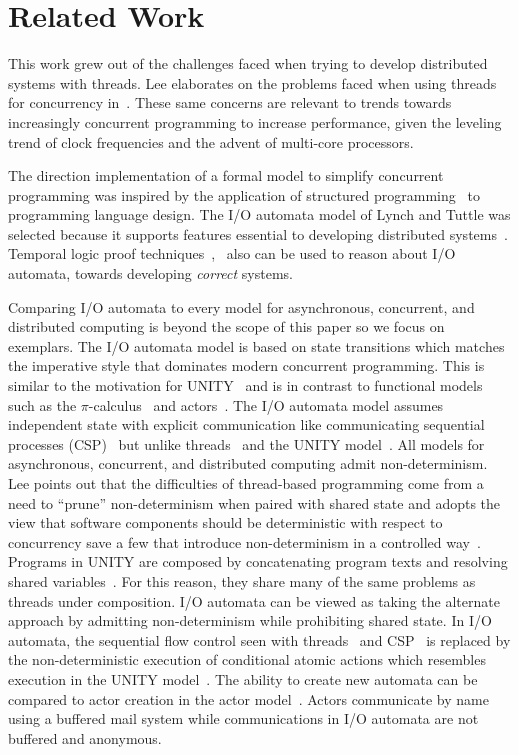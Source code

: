 \section{Related Work\label{related_work}}

This work grew out of the challenges faced when trying to develop distributed systems with threads.
Lee elaborates on the problems faced when using threads for concurrency in~\cite{lee2006problem}.
These same concerns are relevant to trends towards increasingly concurrent programming to increase performance, given the leveling trend of clock frequencies and the advent of multi-core processors\cite{sutter2005software}.

The direction implementation of a formal model to simplify concurrent programming was inspired by the application of structured programming~\cite{dijkstra1968letters} to programming language design.
The I/O automata model of Lynch and Tuttle\cite{lynch1987hierarchical} was selected because it supports features essential to developing distributed systems~\cite{lynch1996distributed}.
Temporal logic proof techniques~\cite{manna1992temporal},~\cite{lamport1978time} also can be used to reason about I/O automata, towards developing \emph{correct} systems.

Comparing I/O automata to every model for asynchronous, concurrent, and distributed computing is beyond the scope of this paper so we focus on exemplars.
The I/O automata model is based on state transitions which matches the imperative style that dominates modern concurrent programming.
This is similar to the motivation for UNITY~\cite{chandy1988parallel} and is in contrast to functional models such as the $\pi$-calculus~\cite{milner1992calculus} and actors~\cite{agha1986actors}.
The I/O automata model assumes independent state with explicit communication like communicating sequential processes (CSP)~\cite{hoare1978communicating} but unlike threads~\cite{lee2006problem} and the UNITY model~\cite{chandy1988parallel}.
All models for asynchronous, concurrent, and distributed computing admit non-determinism.
Lee points out that the difficulties of thread-based programming come from a need to ``prune'' non-determinism when paired with shared state and adopts the view that software components should be deterministic with respect to concurrency save a few that introduce non-determinism in a controlled way~\cite{lee2006problem}.
Programs in UNITY are composed by concatenating program texts and resolving shared variables~\cite{chandy1988parallel}.
For this reason, they share many of the same problems as threads under composition.
I/O automata can be viewed as taking the alternate approach by admitting non-determinism while prohibiting shared state.
In I/O automata, the sequential flow control seen with threads~\cite{lee2006problem} and CSP~\cite{hoare1978communicating} is replaced by the non-deterministic execution of conditional atomic actions which resembles execution in the UNITY model~\cite{chandy1988parallel}.
The ability to create new automata can be compared to actor creation in the actor model~\cite{agha1986actors}.
Actors communicate by name using a buffered mail system while communications in I/O automata are not buffered and anonymous.

